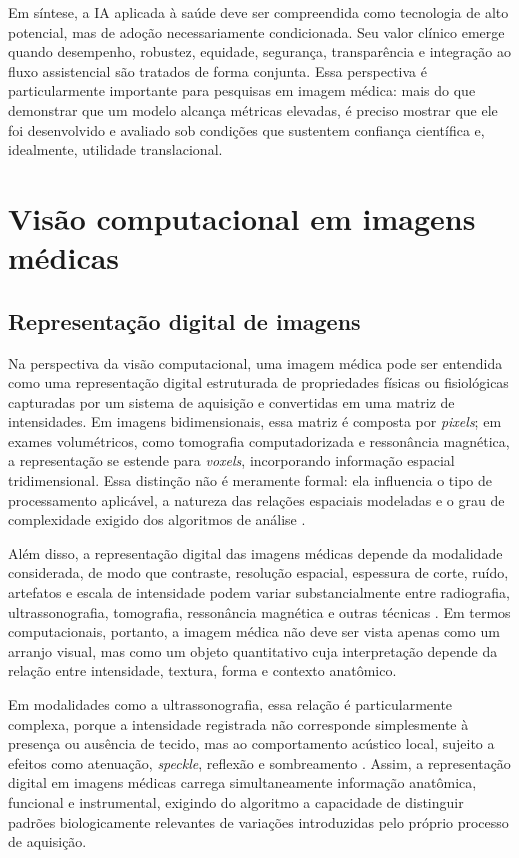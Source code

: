 \documentclass[tcc,capa]{texufpel}
\begin{document}
Em síntese, a IA aplicada à saúde deve ser compreendida como tecnologia de alto potencial, mas de adoção necessariamente condicionada. Seu valor clínico emerge quando desempenho, robustez, equidade, segurança, transparência e integração ao fluxo assistencial são tratados de forma conjunta. Essa perspectiva é particularmente importante para pesquisas em imagem médica: mais do que demonstrar que um modelo alcança métricas elevadas, é preciso mostrar que ele foi desenvolvido e avaliado sob condições que sustentem confiança científica e, idealmente, utilidade translacional. \cite{WHO2021AI,FUTUREAI2025,Lawrence2025RadiologyAI}

\section{Visão computacional em imagens médicas}

\subsection{Representação digital de imagens}

Na perspectiva da visão computacional, uma imagem médica pode ser entendida como uma representação digital estruturada de propriedades físicas ou fisiológicas capturadas por um sistema de aquisição e convertidas em uma matriz de intensidades. Em imagens bidimensionais, essa matriz é composta por \textit{pixels}; em exames volumétricos, como tomografia computadorizada e ressonância magnética, a representação se estende para \textit{voxels}, incorporando informação espacial tridimensional. Essa distinção não é meramente formal: ela influencia o tipo de processamento aplicável, a natureza das relações espaciais modeladas e o grau de complexidade exigido dos algoritmos de análise \cite{Suzuki2012,Zhou2022}.

Além disso, a representação digital das imagens médicas depende da modalidade considerada, de modo que contraste, resolução espacial, espessura de corte, ruído, artefatos e escala de intensidade podem variar substancialmente entre radiografia, ultrassonografia, tomografia, ressonância magnética e outras técnicas \cite{Lee2017,Zhou2022}. Em termos computacionais, portanto, a imagem médica não deve ser vista apenas como um arranjo visual, mas como um objeto quantitativo cuja interpretação depende da relação entre intensidade, textura, forma e contexto anatômico.

Em modalidades como a ultrassonografia, essa relação é particularmente complexa, porque a intensidade registrada não corresponde simplesmente à presença ou ausência de tecido, mas ao comportamento acústico local, sujeito a efeitos como atenuação, \textit{speckle}, reflexão e sombreamento \cite{Guo2018}. Assim, a representação digital em imagens médicas carrega simultaneamente informação anatômica, funcional e instrumental, exigindo do algoritmo a capacidade de distinguir padrões biologicamente relevantes de variações introduzidas pelo próprio processo de aquisição.
\end{document}

